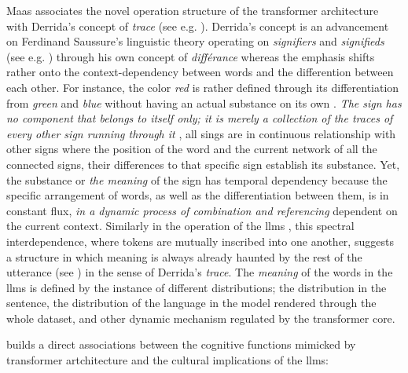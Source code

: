 \yellowsquare
Maas \parencite*{maas2023} associates the novel operation structure of the transformer architecture with Derrida's concept of \textit{trace} (see e.g. \cite[26]{derrida1998}). Derrida's concept is an advancement on Ferdinand Saussure's linguistic theory operating on \textit{signifiers} and \textit{signifieds} (see e.g. \cite*{saussure2007})  through his own concept of \textit{différance} whereas the emphasis shifts rather onto the context-dependency between words and the differention between each other. For instance, the color \textit{red} is rather defined through its differentiation from \textit{green} and \textit{blue} without having an actual substance on its own \parencite[9]{maas2023}. \textit{The sign has no component that belongs to itself only; it is merely a collection of the traces of every other sign running through it} \parencite[44]{cilliers2002}, all sings are in continuous relationship with other signs where the position of the word and the current network of all the connected signs, their differences to that specific sign establish its substance. Yet, the substance or \textit{the meaning} of the sign has temporal dependency because the specific arrangement of words, as well as the differentiation between them, is in constant flux, \textit{in a dynamic process of combination and referencing} \parencite[44]{cilliers2002} dependent on the current context. Similarly in the operation of the \glspl{llm} , this spectral interdependence, where tokens are mutually inscribed into one another, suggests a structure in which meaning is always already haunted by the rest of the utterance (see \cite[12]{maas2023}) in the sense of Derrida's \textit{trace}. The \textit{meaning} of the words in the \glspl{llm} is defined by the instance of different distributions; the distribution in the sentence, the distribution of the language in the model rendered through the whole dataset, and other dynamic mechanism regulated by the transformer core.

%
\citeauthor{montanari2025} \parencite*{montanari2025} builds a direct
associations between the cognitive functions mimicked by transformer artchitecture
and the cultural implications of the \glspl{llm}:

